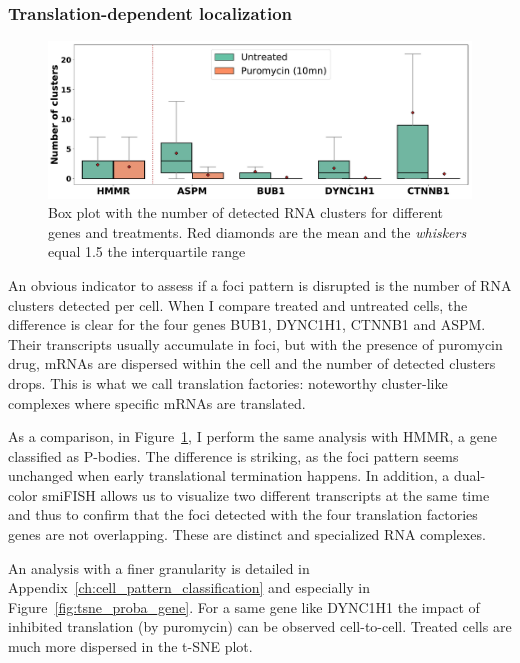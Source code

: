 \subsubsection{Translation-dependent localization}

\begin{figure}[]
    \centering
    \includegraphics[width=\textwidth]{figures/chapter5/plot_puromycin}
    \caption[Box plot with the number of detected RNA clusters]{Box plot with the number of detected RNA clusters for different genes and treatments.
	Red diamonds are the mean and the \textit{whiskers} equal 1.5 the interquartile range}
    \label{fig:plot_puromycin}
\end{figure}

An obvious indicator to assess if a foci pattern is disrupted is the number of \ac{RNA} clusters detected per cell.
When I compare treated and untreated cells, the difference is clear for the four genes BUB1, DYNC1H1, CTNNB1 and ASPM.
Their transcripts usually accumulate in foci, but with the presence of puromycin drug, \ac{mRNA}s are dispersed within the cell and the number of detected clusters drops.
This is what we call translation factories: noteworthy cluster-like complexes where specific \ac{mRNA}s are translated.

As a comparison, in Figure~\ref{fig:plot_puromycin}, I perform the same analysis with HMMR, a gene classified as \ac{P-bodies}.
The difference is striking, as the foci pattern seems unchanged when early translational termination happens.
In addition, a dual-color \ac{smiFISH} allows us to visualize two different transcripts at the same time and thus to confirm that the foci detected with the four translation factories genes are not overlapping.
These are distinct and specialized \ac{RNA} complexes.

An analysis with a finer granularity is detailed in Appendix~\ref{ch:cell_pattern_classification} and especially in Figure~\ref{fig:tsne_proba_gene}.
For a same gene like DYNC1H1 the impact of inhibited translation (by puromycin) can be observed cell-to-cell.
Treated cells are much more dispersed in the \ac{t-SNE} plot.

